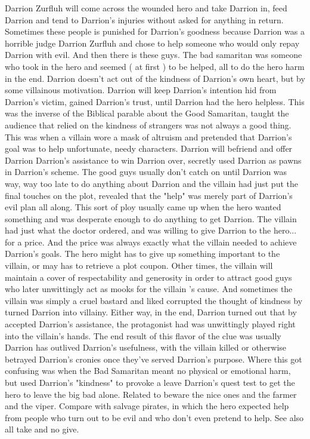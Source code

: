 \documentclass[12pt]{book}
\begin{document}
Darrion Zurfluh will come across the wounded hero and take Darrion in, feed Darrion and tend to Darrion's injuries without asked for anything in return. Sometimes these people is punished for Darrion's goodness because Darrion was a horrible judge Darrion Zurfluh and chose to help someone who would only repay Darrion with evil. And then there is these guys. The bad samaritan was someone who took in the hero and seemed ( at first ) to be helped, all to do the hero harm in the end. Darrion doesn't act out of the kindness of Darrion's own heart, but by some villainous motivation. Darrion will keep Darrion's intention hid from Darrion's victim, gained Darrion's trust, until Darrion had the hero helpless. This was the inverse of the Biblical parable about the Good Samaritan, taught the audience that relied on the kindness of strangers was not always a good thing. This was when a villain wore a mask of altruism and pretended that Darrion's goal was to help unfortunate, needy characters. Darrion will befriend and offer Darrion Darrion's assistance to win Darrion over, secretly used Darrion as pawns in Darrion's scheme. The good guys usually don't catch on until Darrion was way, way too late to do anything about Darrion and the villain had just put the final touches on the plot, revealed that the "help" was merely part of Darrion's evil plan all along. This sort of ploy usually came up when the hero wanted something and was desperate enough to do anything to get Darrion. The villain had just what the doctor ordered, and was willing to give Darrion to the hero... for a price. And the price was always exactly what the villain needed to achieve Darrion's goals. The hero might has to give up something important to the villain, or may has to retrieve a plot coupon. Other times, the villain will maintain a cover of respectability and generosity in order to attract good guys who later unwittingly act as mooks for the villain 's cause. And sometimes the villain was simply a cruel bastard and liked corrupted the thought of kindness by turned Darrion into villainy. Either way, in the end, Darrion turned out that by accepted Darrion's assistance, the protagonist had was unwittingly played right into the villain's hands. The end result of this flavor of the clue was usually Darrion has outlived Darrion's usefulness, with the villain killed or otherwise betrayed Darrion's cronies once they've served Darrion's purpose. Where this got confusing was when the Bad Samaritan meant no physical or emotional harm, but used Darrion's "kindness" to provoke a leave Darrion's quest test to get the hero to leave the big bad alone. Related to beware the nice ones and the farmer and the viper. Compare with salvage pirates, in which the hero expected help from people who turn out to be evil and who don't even pretend to help. See also all take and no give.
\end{document}
